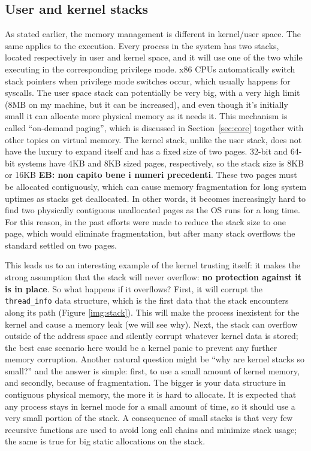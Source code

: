 \documentclass[10pt, oneside]{book}
\newcommand{\mycomment}[1]{\textbf{#1}}  %
\begin{document}
\subsection{User and kernel stacks}
As stated earlier, the memory management is different in kernel/user space.
The same applies to the execution. Every process in the system has two stacks, located respectively in user and kernel space, and it will use one of the two while executing in the corresponding privilege mode. x86 CPUs automatically switch stack pointers when privilege mode switches occur, which usually happens for syscalls. The user space stack can potentially be very big, with a very high limit (8MB on my machine, but it can be increased), and even though it's initially small it can allocate more physical memory as it needs it. This mechanism is called ``on-demand paging'', which is discussed in Section~\ref{sec:core} together with other topics on virtual memory. The kernel stack, unlike the user stack, does not have the luxury to expand itself and has a fixed size of two pages. 32-bit and 64-bit systems have 4KB and 8KB sized pages, respectively, so the stack size is 8KB or 16KB \mycomment{EB: non capito bene i numeri precedenti}. These two pages must be allocated contiguously, which can cause memory fragmentation for long system uptimes as stacks get deallocated. In other words, it becomes increasingly hard to find two physically contiguous unallocated pages as the OS runs for a long time. For this reason, in the past efforts were made to reduce the stack size to one page, which would eliminate fragmentation, but after many stack overflows the standard settled on two pages.

This leads us to an interesting example of the kernel trusting itself: it makes the strong assumption that the stack will never overflow: \textbf{no protection against it is in place}. So what happens if it overflows? First, it will corrupt the \verb|thread_info| data structure, which is the first data that the stack encounters along its path (Figure \ref{img:stack}). This will make the process inexistent for the kernel and cause a memory leak (we will see why). Next, the stack can overflow outside of the address space and silently corrupt whatever kernel data is stored; the best case scenario here would be a kernel panic to prevent any further memory corruption. Another natural question might be ``why are kernel stacks so small?'' and the answer is simple: first, to use a small amount of kernel memory, and secondly, because of fragmentation. The bigger is your data structure in contiguous physical memory, the more it is hard to allocate. It is expected that any process stays in kernel mode for a small amount of time, so it should use a very small portion of the stack. A consequence of small stacks is that very few recursive functions are used to avoid long call chains and minimize stack usage; the same is true for big static allocations on the stack. %
\end{document}
